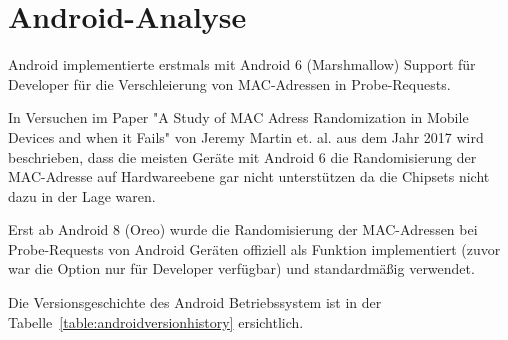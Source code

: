 \cleardoublepage

\section{Android-Analyse
\label{section:androidanalysis}}
Android implementierte erstmals mit Android 6 (Marshmallow) Support für Developer
für die Verschleierung von MAC-Adressen in Probe-Requests.

In Versuchen im Paper "A Study of MAC Adress Randomization in Mobile Devices 
and when it Fails" von Jeremy Martin et. al. aus dem Jahr 2017 wird beschrieben, 
dass die meisten Geräte mit Android 6 die Randomisierung der MAC-Adresse auf Hardwareebene 
gar nicht unterstützen da die Chipsets nicht dazu in der Lage waren.

Erst ab Android 8 (Oreo) wurde die Randomisierung der MAC-Adressen bei Probe-Requests
von Android Geräten offiziell als Funktion implementiert (zuvor war die Option nur 
für Developer verfügbar) und standardmäßig verwendet.

Die Versionsgeschichte des Android Betriebssystem ist in der 
Tabelle~\ref{table:androidversionhistory} ersichtlich.

